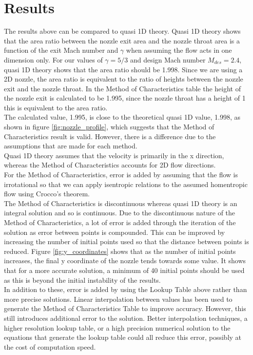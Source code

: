 \documentclass[10pt,a4paper]{article}
\begin{document}
\section{Results}
The results above can be compared to quasi 1D theory. Quasi 1D theory shows that the area ratio between the nozzle exit area and the nozzle throat area is a function of the exit Mach number and $\gamma$ when assuming the flow acts in one dimension only. For our values of $\gamma = 5/3$ and design Mach number $M_{des}=2.4$, quasi 1D theory shows that the area ratio should be 1.998. Since we are using a 2D nozzle, the area ratio is equivalent to the ratio of heights between the nozzle exit and the nozzle throat. In the Method of Characteristics table the height of the nozzle exit is calculated to be 1.995, since the nozzle throat has a height of 1 this is equivalent to the area ratio.
\\The calculated value, 1.995, is close to the theoretical quasi 1D value, 1.998, as shown in figure \ref{fig:nozzle_profile}, which suggests that the Method of Characteristics result is valid. However, there is a difference due to the assumptions that are made for each method.
\\Quasi 1D theory assumes that the velocity is primarily in the x direction, whereas the Method of Characteristics accounts for 2D flow directions. 
\\For the Method of Characteristics, error is added by assuming that the flow is irrotational so that we can apply isentropic relations to the assumed homentropic flow using Crocco's theorem.
\\The Method of Characteristics is discontinuous whereas quasi 1D theory is an integral solution and so is continuous. Due to the discontinuous nature of the Method of Characteristics, a lot of error is added through the iteration of the solution as error between points is compounded. This can be improved by increasing the number of initial points used so that the distance between points is reduced. Figure \ref{fig:y_coordinates} shows that as the number of initial points increases, the final y coordinate of the nozzle tends towards some value. It shows that for a more accurate solution, a minimum of 40 initial points should be used as this is beyond the initial instability of the results.
\\In addition to these, error is added by using the Lookup Table above rather than more precise solutions. Linear interpolation between values has been used to generate the Method of Characteristics Table to improve accuracy. However, this still introduces additional error to the solution. Better interpolation techniques, a higher resolution lookup table, or a high precision numerical solution to the equations that generate the lookup table could all reduce this error, possibly at the cost of computation speed.
\end{document}
